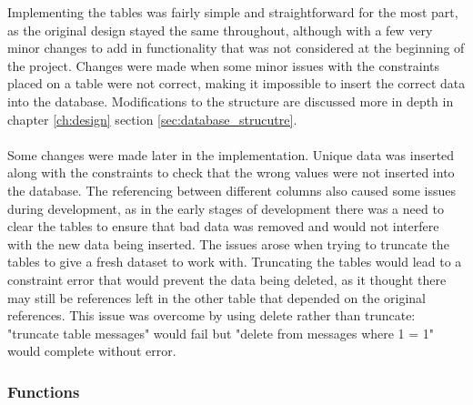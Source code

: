 Implementing the tables was fairly simple and straightforward for the most part, as the original design stayed the same throughout, although with a few very minor changes to add in functionality that was not considered at the beginning of the project. Changes were made when some minor issues with the constraints placed on a table were not correct, making it impossible to insert the correct data into the database. Modifications to the structure are discussed more in depth in chapter \ref{ch:design} section \ref{sec:database_strucutre}.\\
\\
Some changes were made later in the implementation. Unique data was inserted along with the constraints to check that the wrong values were not inserted into the database. The referencing between different columns also caused some issues during development, as in the early stages of development there was a need to clear the tables to ensure that bad data was removed and would not interfere with the new data being inserted. The issues arose when trying to truncate the tables to give a fresh dataset to work with. Truncating the tables would lead to a constraint error that would prevent the data being deleted, as it thought there may still be references left in the other table that depended on the original references. This issue was overcome by using delete rather than truncate: "truncate table messages" would fail but "delete from messages where 1 = 1" would complete without error.

\subsubsection{Functions}

